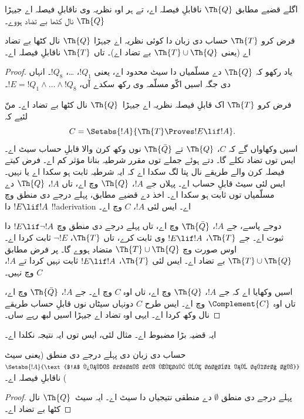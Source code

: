 \documentclass[../../../include/open-logic-section]{subfiles}
\begin{document}


اگلے قضیے مطابق $\Th{Q}$ ناقابلِ فیصلہ اے، تے ہر اوہ نظریہ
وی ناقابلِ فیصلہ اے جیہڑا $\Th{Q}$ نال کٹھا بے تضاد ہووے۔

\begin{thm}
فرض کرو $\Th{T}$ حساب دی زبان دا کوئی نظریہ اے جیہڑا
$\Th{Q}$ نال کٹھا بے تضاد اے (یعنی $\Th{T} \cup \Th{Q}$
بے تضاد اے)۔ تاں $\Th{T}$ ناقابلِ فیصلہ اے۔
\end{thm}

\begin{proof}
یاد رکھو کہ $\Th{Q}$ دے مسلّمیاں دا سیٹ محدود اے، یعنی
$!Q_1$، \dots، $!Q_8$۔ انہاں دی جگہ اسیں اکّو مسلّمہ وی
رکھ سکدے آں، $!E = !Q_1 \land
\dots \land !Q_8$۔

فرض کرو $\Th{T}$ اک قابلِ فیصلہ نظریہ اے جیہڑا~$\Th{Q}$ نال
کٹھا بے تضاد اے۔ منّ لئیے کہ
\[
C = \Setabs{!A}{\Th{T} \Proves !E \lif !A}.
\]
اسیں وکھاواں گے کہ $C$، $\Th{Q}$ تے $\Th{\bar Q}$ نوں
وکھ کرن والا قابلِ حساب سیٹ اے۔ ایس توں تضاد نکلے گا۔
دتے ہوئے جملے توں مقرر شرطیہ بنانا مؤثر کم اے۔ فرض کیتے
فیصلہ کرن والے طریقے نال پتا لگ سکدا اے کہ ایہ شرطیہ ثابت
ہو سکدا اے یا نہیں۔ ایس لئی سیٹ قابلِ حساب اے۔ پہلاں جے
$!A$، $\Th{Q}$ وچ اے، تاں $!A$، $\Th{Q}$ دے مسلّمیاں توں
ثابت ہو سکدا اے۔ اخذ دے قضیے مطابق، پہلے درجے دی منطق وچ
$!E \lif !A$ دا !!a{derivation} اے۔ ایس لئی $!A$، $C$ وچ اے۔

دوجے پاسے، جے $!A$، $\Th{\bar Q}$ وچ اے، تاں پہلے درجے دی
منطق وچ $!E \lif \lnot !A$ دا ثبوت اے۔ جے $\Th{T}$،
$!E \lif !A$ وی ثابت کرے، تاں $\Th{T}$، $\lnot !E$ ثابت
کردا اے۔ اوس صورت وچ $\Th{T}
\cup \Th{Q}$ متضاد ہووے گا۔ پر فرض مطابق
$\Th{T} \cup \Th{Q}$ بے تضاد اے۔ ایس لئی $\Th{T}$،
$!E \lif !A$ ثابت نہیں کردا تے $!A$، $C$ وچ نہیں۔

اسیں وکھایا اے کہ جے $!A$، $\Th{Q}$ وچ اے، تاں اوہ $C$
وچ اے۔ جے $!A$، $\Th{\bar Q}$ وچ اے، تاں اوہ
$\Complement{C}$ وچ اے۔ ایس طرح $C$ دونہاں سیٹاں نوں
قابلِ حساب طریقے نال وکھ کردا اے۔ ایہی اوہ تضاد اے جیہڑا
اسیں لبھ رہے ساں۔
\end{proof}

ایہ قضیہ بڑا مضبوط اے۔ مثال لئی، ایس توں ایہ نتیجہ نکلدا اے۔

\begin{cor}
حساب دی زبان دی پہلے درجے دی منطق (یعنی سیٹ
$\Setabs{!A}{\text{$!A$ پہلے درجے دی منطق وچ ثابت ہو سکدا اے}}$)
ناقابلِ فیصلہ اے۔
\end{cor}

\begin{proof}
پہلے درجے دی منطق $\emptyset$ دے منطقی نتیجیاں دا سیٹ اے۔
ایہ سیٹ~$\Th{Q}$ نال کٹھا بے تضاد اے۔
\end{proof}
\end{document}
